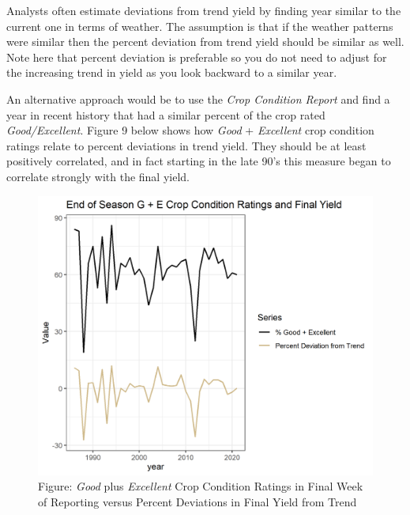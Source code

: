 \documentclass[
]{book}
\begin{document}
Analysts often estimate deviations from trend yield by finding year similar to the current one in terms of weather. The assumption is that if the weather patterns were similar then the percent deviation from trend yield should be similar as well. Note here that percent deviation is preferable so you do not need to adjust for the increasing trend in yield as you look backward to a similar year.

An alternative approach would be to use the \emph{Crop Condition Report} and find a year in recent history that had a similar percent of the crop rated \emph{Good/Excellent}. Figure 9 below shows how \emph{Good} + \emph{Excellent} crop condition ratings relate to percent deviations in trend yield. They should be at least positively correlated, and in fact starting in the late 90's this measure began to correlate strongly with the final yield.

\begin{figure}
\centering
\includegraphics{assets/ForecastProduction-PercDeviationVSGE.png}
\caption{Figure: \emph{Good} plus \emph{Excellent} Crop Condition Ratings in Final Week of Reporting versus Percent Deviations in Final Yield from Trend}
\end{figure}
\end{document}
